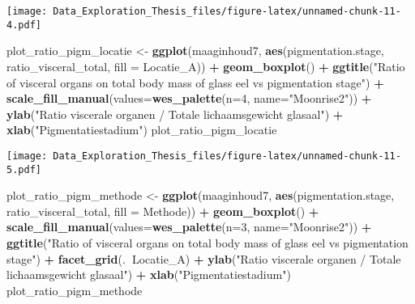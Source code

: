 \documentclass[]{article}
\newenvironment{Shaded}{\begin{snugshade}}{\end{snugshade}}
\newcommand{\KeywordTok}[1]{\textcolor[rgb]{0.13,0.29,0.53}{\textbf{#1}}}
\newcommand{\DataTypeTok}[1]{\textcolor[rgb]{0.13,0.29,0.53}{#1}}
\newcommand{\DecValTok}[1]{\textcolor[rgb]{0.00,0.00,0.81}{#1}}
\newcommand{\StringTok}[1]{\textcolor[rgb]{0.31,0.60,0.02}{#1}}
\newcommand{\OperatorTok}[1]{\textcolor[rgb]{0.81,0.36,0.00}{\textbf{#1}}}
\newcommand{\NormalTok}[1]{#1}
\begin{document}
\texttt{[image: Data\_Exploration\_Thesis\_files/figure-latex/unnamed-chunk-11-4.pdf]}

\begin{Shaded}
\begin{Highlighting}[]
\NormalTok{plot_ratio_pigm_locatie <-}\StringTok{ }\KeywordTok{ggplot}\NormalTok{(maaginhoud7, }\KeywordTok{aes}\NormalTok{(pigmentation.stage, ratio_visceral_total, }\DataTypeTok{fill =}\NormalTok{ Locatie_A)) }\OperatorTok{+}
\StringTok{  }\KeywordTok{geom_boxplot}\NormalTok{() }\OperatorTok{+}
\StringTok{  }\KeywordTok{ggtitle}\NormalTok{(}\StringTok{"Ratio of visceral organs on total body mass of glass eel vs pigmentation stage"}\NormalTok{) }\OperatorTok{+}
\StringTok{  }\KeywordTok{scale_fill_manual}\NormalTok{(}\DataTypeTok{values=}\KeywordTok{wes_palette}\NormalTok{(}\DataTypeTok{n=}\DecValTok{4}\NormalTok{, }\DataTypeTok{name=}\StringTok{"Moonrise2"}\NormalTok{)) }\OperatorTok{+}\StringTok{ }
\StringTok{  }\KeywordTok{ylab}\NormalTok{(}\StringTok{"Ratio viscerale organen / Totale lichaamsgewicht glasaal"}\NormalTok{) }\OperatorTok{+}
\StringTok{  }\KeywordTok{xlab}\NormalTok{(}\StringTok{"Pigmentatiestadium"}\NormalTok{)}
\NormalTok{plot_ratio_pigm_locatie}
\end{Highlighting}
\end{Shaded}

\texttt{[image: Data\_Exploration\_Thesis\_files/figure-latex/unnamed-chunk-11-5.pdf]}

\begin{Shaded}
\begin{Highlighting}[]
\NormalTok{plot_ratio_pigm_methode <-}\StringTok{ }\KeywordTok{ggplot}\NormalTok{(maaginhoud7, }\KeywordTok{aes}\NormalTok{(pigmentation.stage, ratio_visceral_total, }\DataTypeTok{fill =}\NormalTok{ Methode)) }\OperatorTok{+}
\StringTok{  }\KeywordTok{geom_boxplot}\NormalTok{() }\OperatorTok{+}
\StringTok{  }\KeywordTok{scale_fill_manual}\NormalTok{(}\DataTypeTok{values=}\KeywordTok{wes_palette}\NormalTok{(}\DataTypeTok{n=}\DecValTok{3}\NormalTok{, }\DataTypeTok{name=}\StringTok{"Moonrise2"}\NormalTok{)) }\OperatorTok{+}\StringTok{ }
\StringTok{  }\KeywordTok{ggtitle}\NormalTok{(}\StringTok{"Ratio of visceral organs on total body mass of glass eel vs pigmentation stage"}\NormalTok{) }\OperatorTok{+}
\StringTok{  }\KeywordTok{facet_grid}\NormalTok{(.}\OperatorTok{~}\NormalTok{Locatie_A) }\OperatorTok{+}
\StringTok{  }\KeywordTok{ylab}\NormalTok{(}\StringTok{"Ratio viscerale organen / Totale lichaamsgewicht glasaal"}\NormalTok{) }\OperatorTok{+}
\StringTok{  }\KeywordTok{xlab}\NormalTok{(}\StringTok{"Pigmentatiestadium"}\NormalTok{)}
\NormalTok{plot_ratio_pigm_methode}
\end{Highlighting}
\end{Shaded}
\end{document}
